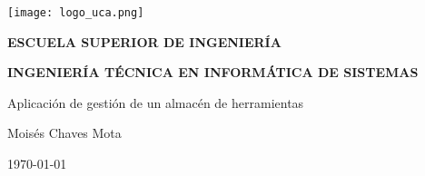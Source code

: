 

\begin{titlepage}

  \begin{center}

    \texttt{[image: logo\_uca.png]} \\
    
    \vspace{2.0cm}
    
    \LARGE{\textbf{ESCUELA SUPERIOR DE INGENIERÍA}} \\
    
    \vspace{1.0cm}
    
    \Large{\textbf{INGENIERÍA TÉCNICA EN INFORMÁTICA DE SISTEMAS}} \\
    
    \vspace{3.0cm}
    
    \Large{Aplicación de gestión de un almacén de herramientas} \\
    
    \vspace{2.0cm}
    
    \Large{Moisés Chaves Mota} \\
  
    \vspace{0.5cm}

    \large{\today}
    
  \end{center}
\end{titlepage}
